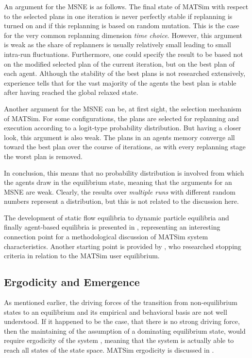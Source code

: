 An argument for the MSNE is as follows. The final state of MATSim with respect to the selected plans in one iteration is never perfectly stable if replanning is turned on and if this replanning is based on random mutation. This is the case for the very common replanning dimension \emph{time choice}. However, this argument is weak as the share of replanners is usually relatively small leading to small intra-run fluctuations. Furthermore, one could specify the result to be based not on the modified selected plan of the current iteration, but on the best plan of each agent. Although the stability of the best plans is not researched extensively, experience tells that for the vast majority of the agents the best plan is stable after having reached the global relaxed state.  

Another argument for the MSNE can be, at first sight, the selection mechanism of MATSim. For some configurations, the plans are selected for replanning and execution according to a logit-type probability distribution. But having a closer look, this argument is also weak. The plans in an agents memory converge all toward the best plan over the course of iterations, as with every replanning stage the worst plan is removed. 

In conclusion, this means that no probability distribution is involved from which the agents draw in the equilibrium state, meaning that the arguments for an MSNE are weak. Clearly, the results over \emph{multiple runs} with different random numbers represent a distribution, but this is not related to the discussion here.

The development of static flow equilibria to dynamic particle equilibria and finally agent-based equilibria is presented in \citet[][]{Nagel_unpub_Latsis_2012, NagelFloetteroed_IATBR_2009}, representing an interesting connection point for a methodological discussion of MATSim system characteristics. Another starting point is provided by \citet[][]{Meister_PhDThesis_2011}, who researched stopping criteria in relation to the MATSim user equilibrium.


\subsection{Ergodicity and Emergence}
As mentioned earlier, the driving forces of the transition from non-equilibrium states to an equilibrium and its empirical and behavioral basis are not well understood. If it happened to be the case, that there is no strong driving force, then the maintaining of the assumption of a dominating equilibrium state, would require ergodicity of the system \citep[see also][p.252]{Holden_JTEP_1989}, meaning that the system is actually able to reach all states of the state space. MATSim ergodicity is discussed in \citet[][]{Floetteroed_unpub_MCM_2012}.    

